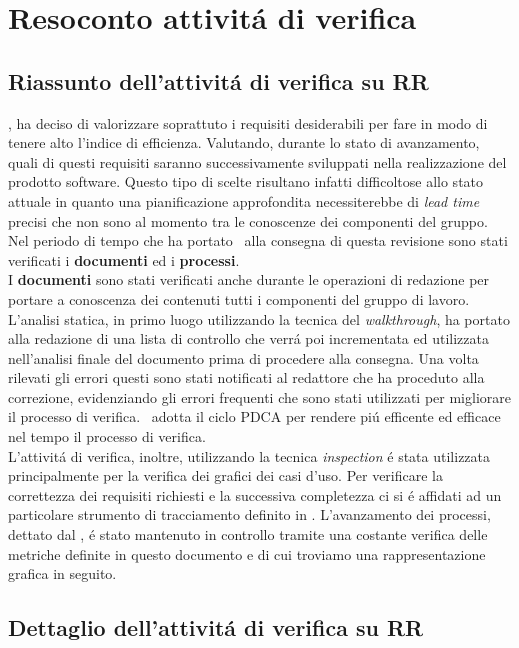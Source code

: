 \section{Resoconto attivit\'a di verifica}
\subsection{Riassunto dell'attivit\'a di verifica su RR}
\gruppo, ha deciso di valorizzare soprattuto i requisiti desiderabili per fare in modo di tenere alto l'indice di efficienza. Valutando, durante lo stato di avanzamento, quali di questi requisiti saranno successivamente sviluppati nella realizzazione del prodotto software. Questo tipo di scelte risultano infatti difficoltose allo stato attuale in quanto una pianificazione approfondita necessiterebbe di \textit{lead time}  precisi che non sono al momento tra le conoscenze dei componenti del gruppo.
Nel periodo di tempo che ha portato \gruppo ~alla consegna di questa revisione sono stati verificati i \textbf{documenti} ed i \textbf{processi}.\\
I \textbf{documenti} sono stati verificati anche durante le operazioni di redazione per portare a conoscenza dei contenuti tutti i componenti del gruppo di lavoro.
L'analisi statica, in primo luogo utilizzando la tecnica del \textit{walkthrough}, ha portato alla redazione  di una lista di controllo che verr\'a poi incrementata ed utilizzata nell'analisi finale del documento prima di procedere alla consegna. Una volta rilevati gli errori questi sono stati notificati al redattore che ha proceduto alla correzione, evidenziando gli errori frequenti che sono stati utilizzati per migliorare il processo di verifica. \gruppo ~adotta il ciclo PDCA per rendere pi\'u efficente ed efficace nel tempo il processo di verifica.\\
L'attivit\'a di verifica, inoltre, utilizzando la tecnica \textit{inspection} \'e stata utilizzata principalmente per la verifica dei grafici dei casi d'uso. Per verificare la correttezza dei requisiti richiesti e la successiva completezza ci si \'e affidati ad un particolare strumento di tracciamento definito in \infoNDP.
L'avanzamento dei processi, dettato dal \infoPDP, \'e stato mantenuto in controllo tramite una costante verifica delle metriche definite in questo documento e di cui troviamo una rappresentazione grafica in seguito.
\subsection{Dettaglio dell'attivit\'a di verifica su RR}
